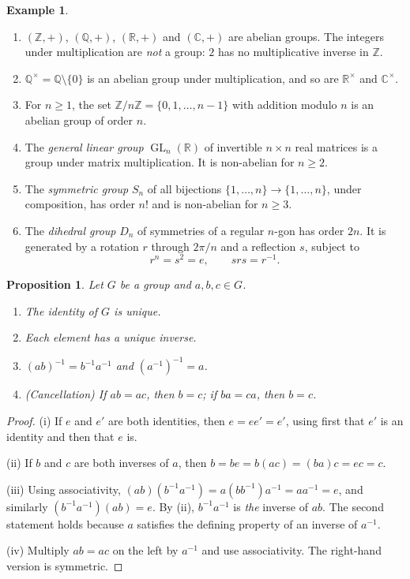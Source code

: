 \documentclass[11pt]{article}
\theoremstyle{plain}
\newtheorem{proposition}[theorem]{Proposition}
\theoremstyle{definition}
\newtheorem{example}[theorem]{Example}
\theoremstyle{remark}
\newcommand{\Z}{\mathbb{Z}}
\newcommand{\Q}{\mathbb{Q}}
\newcommand{\R}{\mathbb{R}}
\newcommand{\C}{\mathbb{C}}
\DeclareMathOperator{\GL}{GL}
\begin{document}
\begin{example}\label{ex:groups}
\leavevmode
\begin{enumerate}[label=(\alph*)]
  \item $(\Z, +)$, $(\Q, +)$, $(\R, +)$ and $(\C, +)$ are abelian groups. The integers under multiplication are \emph{not} a group: $2$ has no multiplicative inverse in $\Z$.
  \item $\Q^\times = \Q \setminus \{0\}$ is an abelian group under multiplication, and so are $\R^\times$ and $\C^\times$.
  \item For $n \ge 1$, the set $\Z/n\Z = \{0, 1, \dots, n-1\}$ with addition modulo $n$ is an abelian group of order $n$.
  \item The \emph{general linear group} $\GL_n(\R)$ of invertible $n \times n$ real matrices is a group under matrix multiplication. It is non-abelian for $n \ge 2$.
  \item The \emph{symmetric group} $S_n$ of all bijections $\{1, \dots, n\} \to \{1, \dots, n\}$, under composition, has order $n!$ and is non-abelian for $n \ge 3$.
  \item The \emph{dihedral group} $D_n$ of symmetries of a regular $n$-gon has order $2n$. It is generated by a rotation $r$ through $2\pi/n$ and a reflection $s$, subject to
  \[
    r^n = s^2 = e, \qquad srs = r^{-1}.
  \]
\end{enumerate}
\end{example}

\begin{proposition}\label{prop:basic}
Let $G$ be a group and $a, b, c \in G$.
\begin{enumerate}[label=\textup{(\roman*)}]
  \item The identity of $G$ is unique.
  \item Each element has a unique inverse.
  \item $(ab)^{-1} = b^{-1}a^{-1}$ and $(a^{-1})^{-1} = a$.
  \item \textup{(Cancellation)} If $ab = ac$, then $b = c$; if $ba = ca$, then $b = c$.
\end{enumerate}
\end{proposition}

\begin{proof}
(i) If $e$ and $e'$ are both identities, then $e = ee' = e'$, using first that $e'$ is an identity and then that $e$ is.

(ii) If $b$ and $c$ are both inverses of $a$, then $b = be = b(ac) = (ba)c = ec = c$.

(iii) Using associativity, $(ab)(b^{-1}a^{-1}) = a(bb^{-1})a^{-1} = aa^{-1} = e$, and similarly $(b^{-1}a^{-1})(ab) = e$. By (ii), $b^{-1}a^{-1}$ is \emph{the} inverse of $ab$. The second statement holds because $a$ satisfies the defining property of an inverse of $a^{-1}$.

(iv) Multiply $ab = ac$ on the left by $a^{-1}$ and use associativity. The right-hand version is symmetric.
\end{proof}
\end{document}

